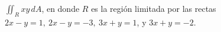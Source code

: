 \item $\iint_R xy \, dA$, en donde $R$ es la región limitada por las rectas $2x - y = 1, \ 2x - y = -3, \ 3x + y = 1$, y $3x + y = -2$.
